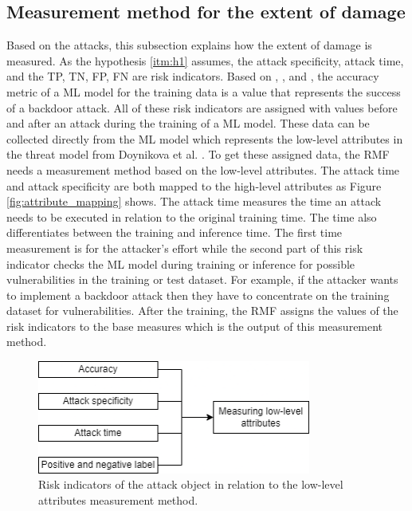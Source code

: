 \subsection{Measurement method for the extent of damage}
\label{sec:ext_dmg}

Based on the attacks, this subsection explains how the extent of damage is measured. As the hypothesis \ref{itm:h1} assumes, the attack specificity, attack time, and the TP, TN, FP, FN are risk indicators. Based on \cite{DBLP:journals/corr/abs-1708-06733}, \cite{turner2018clean}, and \cite{DBLP:journals/corr/abs-1910-00033}, the accuracy metric of a ML model for the training data is a value that represents the success of a backdoor attack. All of these risk indicators are assigned with values before and after an attack during the training of a ML
model. These data can be collected directly from the ML model which represents the low-level attributes in the threat model from Doynikova et al. \cite{DBLP:conf/crisis/DoynikovaNGK20}. To get these assigned data, the RMF needs a measurement method based on the low-level attributes. The attack time and attack specificity are both mapped to the high-level attributes as Figure \ref{fig:attribute_mapping} shows. The attack time measures the time an attack needs to be executed in relation to the original training time. The time also differentiates between the training and inference time. The first time measurement is for the attacker's effort while the second part of this risk indicator checks the ML model during training or inference for possible vulnerabilities \cite{DBLP:journals/csur/RosenbergSER21} in the training or test dataset. For example, if the attacker wants to implement a backdoor attack then they have to concentrate on the training dataset for vulnerabilities. After the training, the RMF assigns the values of the risk indicators to the base measures which is the output of this measurement method.

\begin{figure}[ht!]
  \centering
  \includegraphics[width=9cm]{pictures/measure_damage.png}
  \caption{Risk indicators of the attack object in relation to the low-level attributes measurement method.}
  \label{fig:measure_damage}
\end{figure}

